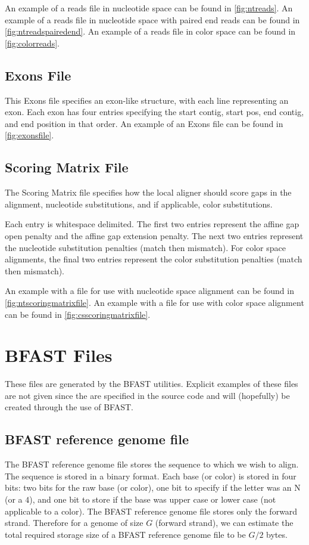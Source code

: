 \documentclass[a4paper,12pt]{book}
\newcommand{\BRGF}{BFAST reference genome file} %
\begin{document}
An example of a reads file in nucleotide space can be found in \autoref{fig:ntreads}. 
An example of a reads file in nucleotide space with paired end reads can be found in \autoref{fig:ntreadspairedend}. 
An example of a reads file in color space can be found in \autoref{fig:colorreads}. 

\subsection{Exons File}
\label{sec:exonsfile}
This Exons file specifies an exon-like structure, with each line representing an exon.
Each exon has four entries specifying the start contig, start pos, end contig, and end position in that order.
An example of an Exons file can be found in \autoref{fig:exonsfile}.
\subsection{Scoring Matrix File}
\label{sec:scoringmatrixfile}
The Scoring Matrix file specifies how the local aligner should score gaps in the alignment, nucleotide substitutions, and if applicable, color substitutions.

Each entry is whitespace delimited.
The first two entries represent the affine gap open penalty and the affine gap extension penalty.
The next two entries represent the nucleotide substitution penalties (match then mismatch).
For color space alignments, the final two entries represent the color substitution penalties (match then mismatch).

An example with a file for use with nucleotide space alignment can be found in \autoref{fig:ntscoringmatrixfile}.
An example with a file for use with color space alignment can be found in \autoref{fig:csscoringmatrixfile}.

\section{BFAST Files}
These files are generated by the BFAST utilities. 
Explicit examples of these files are not given since the are specified in the source code and will (hopefully) be created through the use of BFAST.
\label{sec:bfastfiles}
\subsection{\BRGF{}}
\label{sec:brgf}
The \BRGF{} stores the sequence to which we wish to align.
The sequence is stored in a binary format.
Each base (or color) is stored in four bits: two bits for the raw base (or color), one bit to specify if the letter was an N (or a $4$), and one bit to store if the base was upper case or lower case (not applicable to a color).
The \BRGF{} stores only the forward strand.
Therefore for a genome of size $G$ (forward strand), we can estimate the total required storage size of a \BRGF{} to be $G/2$ bytes.
\end{document}
